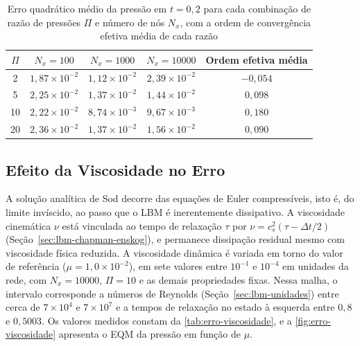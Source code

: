 \begin{table}[H]
    \centering
    \caption{Erro quadrático médio da pressão em \(t = 0{,}2\) para cada combinação de razão de pressões \(\Pi\) e número de nós \(N_x\), com a ordem de convergência efetiva média de cada razão}
    \label{tab:erro-razao-pressoes}
    \begin{tabular}{ccccc}
        \toprule
        \(\Pi\) & \(N_x=100\) & \(N_x=1000\) & \(N_x=10000\) & Ordem efetiva média \\
        \midrule
        2 & \(1{,}87\times10^{-2}\) & \(1{,}12\times10^{-2}\) & \(2{,}39\times10^{-2}\) & \(-0{,}054\) \\
        5 & \(2{,}25\times10^{-2}\) & \(1{,}37\times10^{-2}\) & \(1{,}44\times10^{-2}\) & \(0{,}098\) \\
        10 & \(2{,}22\times10^{-2}\) & \(8{,}74\times10^{-3}\) & \(9{,}67\times10^{-3}\) & \(0{,}180\) \\
        20 & \(2{,}36\times10^{-2}\) & \(1{,}37\times10^{-2}\) & \(1{,}56\times10^{-2}\) & \(0{,}090\) \\
        \bottomrule
    \end{tabular}
\end{table}


\subsection{Efeito da Viscosidade no Erro}\label{subsec:efeito-da-viscosidade-no-erro}

A solução analítica de Sod decorre das equações de Euler compressíveis, isto é, do limite invíscido, ao passo que o LBM é inerentemente dissipativo.
A viscosidade cinemática \(\nu\) está vinculada ao tempo de relaxação \(\tau\) por \(\nu=c_s^2(\tau-\Delta t/2)\) (Seção~\ref{sec:lbm-chapman-enskog}), e permanece dissipação residual mesmo com viscosidade física reduzida.
A viscosidade dinâmica é variada em torno do valor de referência (\(\mu=1{,}0\times10^{-2}\)), em sete valores entre \(10^{-1}\) e \(10^{-4}\) em unidades da rede, com \(N_x=10000\), \(\Pi=10\) e as demais propriedades fixas.
Nessa malha, o intervalo corresponde a números de Reynolds (Seção~\ref{sec:lbm-unidades}) entre cerca de \(7\times10^{4}\) e \(7\times10^{7}\) e a tempos de relaxação no estado à esquerda entre \(0{,}8\) e \(0{,}5003\).
Os valores medidos constam da \autoref{tab:erro-viscosidade}, e a \autoref{fig:erro-viscosidade} apresenta o EQM da pressão em função de \(\mu\).

